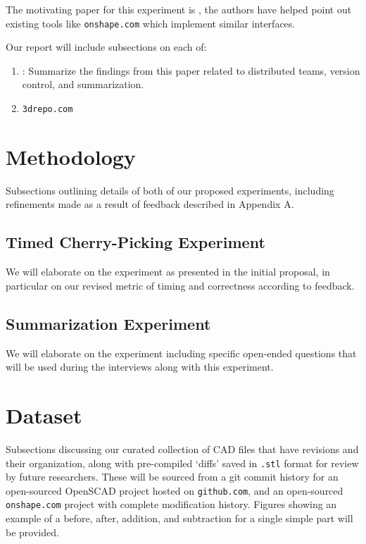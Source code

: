 \documentclass[sigconf,authorversion,nonacm]{acmart}
\begin{document}
The motivating paper for this experiment is \citet{cheng2023age}, the authors have helped point out existing tools like \texttt{onshape.com} which implement similar interfaces.

Our report will include subsections on each of:

\begin{enumerate}
	\item \citet{cheng2023age}: Summarize the findings from this paper related to distributed teams, version control, and summarization.
	\item {\texttt{3drepo.com}}
\end{enumerate}

\section{Methodology}

Subsections outlining details of both of our proposed experiments, including refinements made as a result of feedback described in Appendix A.

\subsection{Timed Cherry-Picking Experiment}

We will elaborate on the experiment as presented in the initial proposal, in particular on our revised metric of timing and correctness according to feedback.

\subsection{Summarization Experiment}

We will elaborate on the experiment including specific open-ended questions that will be used during the interviews along with this experiment.

\section{Dataset}

Subsections discussing our curated collection of CAD files that have revisions and their organization, along with pre-compiled `diffs' saved in \texttt{.stl} format for review by future researchers. These will be sourced from a git commit history for an open-sourced OpenSCAD project hosted on \texttt{github.com}, and an open-sourced \texttt{onshape.com} project with complete modification history.
Figures showing an example of a before, after, addition, and subtraction for a single simple part will be provided.
\end{document}
